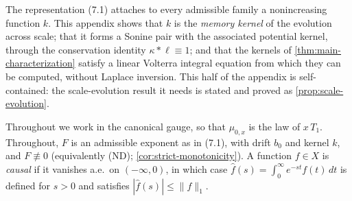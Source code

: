 %
%
%

The representation (7.1) attaches to every admissible family a nonincreasing function $k$.
This appendix shows that $k$ is the \emph{memory kernel} of the evolution across scale; that it
forms a Sonine pair with the associated potential kernel, through the conservation identity
$\kappa * \ell \equiv 1$; and that the kernels of \ref{thm:main-characterization} satisfy a
linear Volterra integral equation from which they can be computed, without Laplace inversion.
This half of the appendix is self-contained: the scale-evolution result it needs is stated and proved as
\ref{prop:scale-evolution}.

Throughout we work in the canonical gauge, so that $\mu_{0,x}$ is the law of $x\,T_1$.
Throughout, $F$ is an admissible exponent as in (7.1), with drift $b_0$ and kernel $k$, and
$F \not\equiv 0$ (equivalently (ND); \ref{cor:strict-monotonicity}). A function $f \in X$ is
\emph{causal} if it vanishes a.e.\ on $(-\infty, 0)$, in which case
$\hat f(s) = \int_0^\infty e^{-st} f(t)\,dt$ is defined for $s > 0$ and satisfies
$|\hat f(s)| \le \|f\|_1$.

